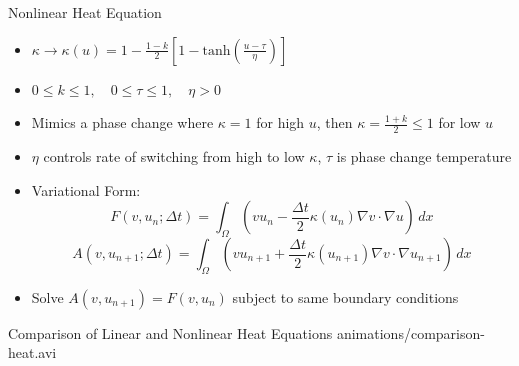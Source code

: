 \documentclass[serif]{beamer}
\begin{document}
\begin{frame}{Nonlinear Heat Equation}
    \begin{itemize}
        \item $\kappa \to \kappa(u) = 1 - \frac{1 - k}{2} \left[
        1 - \mathrm{tanh}\left(\frac{u - \tau}{\eta}\right)\right]$
        \item $0 \leq k \leq 1, \quad 0 \leq \tau \leq 1, \quad \eta > 0$
        \item Mimics a phase change where $\kappa = 1$ for high $u$, then
        $\kappa = \frac{1 + k}{2} \leq 1$ for low $u$
        \item $\eta$ controls rate of switching from high to low $\kappa$, $\tau$ is phase change temperature
				\item Variational Form:
					\[
						F(v, u_n; \Delta t) = \int_\Omega \left(v u_n - \frac{\Delta t}{2} \kappa(u_n) \nabla v \cdot \nabla u\right) \, dx
					\] 
					\[
						A(v, u_{n+1}; \Delta t) = \int_\Omega \left(v u_{n+1} + \frac{\Delta t}{2} \kappa(u_{n+1}) \nabla v \cdot \nabla u_{n+1}\right) \, dx
					\] 
				\item Solve $A(v, u_{n+1}) = F(v, u_n)$ subject to same boundary conditions
    \end{itemize}
\end{frame}

\begin{frame}{Comparison of Linear and Nonlinear Heat Equations}
	\centering
	{animations/comparison-heat.avi}
\end{frame}
\end{document}
